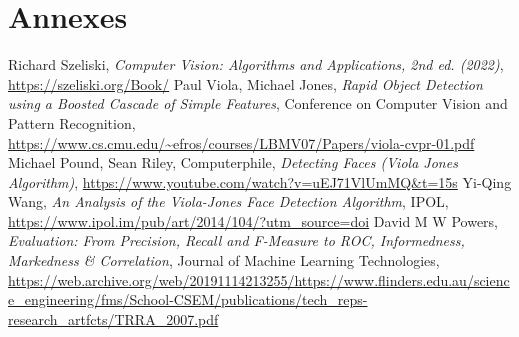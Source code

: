 \documentclass[12pt,a4paper]{article}
\begin{document}
\section*{Annexes}

\begin{thebibliography}{}
    
    Richard Szeliski, \textit{Computer Vision: Algorithms and Applications, 2nd ed. (2022)}, \url{https://szeliski.org/Book/}
    Paul Viola, Michael Jones, \textit{Rapid Object Detection using a Boosted Cascade of Simple Features}, Conference on Computer Vision and Pattern Recognition, \url{https://www.cs.cmu.edu/~efros/courses/LBMV07/Papers/viola-cvpr-01.pdf}
    Michael Pound, Sean Riley, Computerphile, \textit{Detecting Faces (Viola Jones Algorithm)}, \url{https://www.youtube.com/watch?v=uEJ71VlUmMQ&t=15s}
    Yi-Qing Wang, \textit{An Analysis of the Viola-Jones Face Detection Algorithm}, IPOL, \url{https://www.ipol.im/pub/art/2014/104/?utm_source=doi}
    David M W Powers, \textit{Evaluation: From Precision, Recall and F-Measure to ROC, Informedness, Markedness \& Correlation}, Journal of Machine Learning Technologies,  \url{https://web.archive.org/web/20191114213255/https://www.flinders.edu.au/science_engineering/fms/School-CSEM/publications/tech_reps-research_artfcts/TRRA_2007.pdf}


\end{thebibliography}
\end{document}
